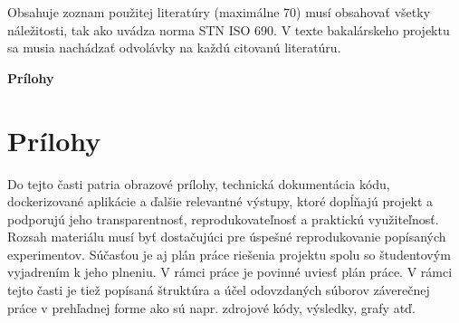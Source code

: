 \documentclass[12pt,a4paper,oneside,openright,slovak]{article}
\begin{document}






\setlength{\cftbeforesecskip}{3pt}

\tableofcontents


\begin{refsegment}

\thispagestyle{empty}

\pagestyle{fancy}
\titleformat{\section}{\Large\bfseries}{\thesection}{1em}{}
\clearpage
{}
\clearpage

\clearpage

\clearpage

\clearpage


\clearpage

\clearpage
Obsahuje zoznam použitej literatúry (maximálne 70) musí obsahovať všetky náležitosti, tak ako uvádza norma STN ISO 690. V texte bakalárskeho projektu sa musia nachádzať odvolávky na každú citovanú literatúru. 

\printbibliography[title=Referencie,segment=\therefsegment]




\thispagestyle{empty}
\mbox{}

\appendix
\captionsetup[figure]{list=no}
\captionsetup[table]{list=no}

\begin{titlepage}
    \centering
    \vspace*{\fill}
    {\Huge\bfseries Prílohy\par}
    \vspace*{\fill}
\end{titlepage}

\clearpage
\renewcommand{\thepage}{A-\arabic{page}}
\setcounter{page}{1}
\section{Prílohy}
Do tejto časti patria obrazové prílohy, technická dokumentácia kódu, dockerizované aplikácie a ďalšie relevantné výstupy, ktoré dopĺňajú projekt a podporujú jeho transparentnosť, reprodukovateľnosť a praktickú využiteľnosť. Rozsah materiálu musí byť dostačujúci pre úspešné reprodukovanie popísaných experimentov.
Súčasťou je aj plán práce riešenia projektu spolu so študentovým vyjadrením k jeho plneniu. V rámci práce je povinné uviesť plán práce.
V rámci tejto časti je tiež popísaná štruktúra a účel odovzdaných súborov záverečnej práce v prehľadnej forme ako sú napr. zdrojové kódy, výsledky, grafy atď.




\end{refsegment}
\end{document}
